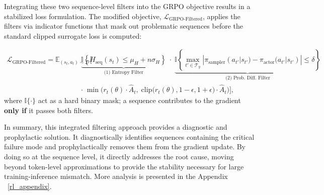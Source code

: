 \documentclass{article}
\begin{document}
Integrating these two sequence-level filters into the GRPO objective results in a stabilized loss formulation. The modified objective, $\mathcal{L}_{\text{GRPO-Filtered}}$, applies the filters via indicator functions that mask out problematic sequences before the standard clipped surrogate loss is computed:

\begin{equation}\label{eq:grpo_filtered}
\begin{aligned}
\mathcal{L}_{\text{GRPO-Filtered}} = \mathbb{E}_{(s_t, a_t) \sim \mathcal{D}} \Bigg[
& \underbrace{\mathbb{I} \left\{ H_{\text{seq}}(s_t) \le \mu_H + n \sigma_H \right\}}_{\text{(1) Entropy Filter}} \;
\cdot \;
\underbrace{\mathbb{I} \left\{ \max_{t' \in \mathcal{T}_y} |\pi_{\text{sampler}}(a_{t'}|s_{t'}) - \pi_{\text{actor}}(a_{t'}|s_{t'})| \le \delta \right\}}_{\text{(2) Prob. Diff. Filter}} \\
& \cdot \;
\min \Big(
r_t(\theta) \cdot \hat{A}_t, \;
\mathrm{clip}\big(r_t(\theta), 1-\epsilon, 1+\epsilon\big) \cdot \hat{A}_t
\Big)
\Bigg],
\end{aligned}
\end{equation}
where $\mathbb{I}\{\cdot\}$ act as a hard binary mask; a sequence contributes to the gradient \textbf{only if} it passes both filters.



In summary, this integrated filtering approach provides a diagnostic and prophylactic solution. It diagnostically identifies sequences containing the critical failure mode and prophylactically removes them from the gradient update. By doing so at the sequence level, it directly addresses the root cause, moving beyond token-level approximations to provide the stability necessary for large training-inference mismatch. More analysis is presented in the Appendix ~\ref{rl_appendix}.
\end{document}
